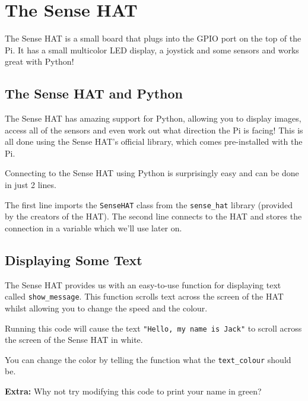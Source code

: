 \section{The Sense HAT}
	The Sense HAT is a small board that plugs into the GPIO port on the top of the Pi. It has a small multicolor LED display, a joystick and some sensors and works great with Python!

	\subsection{The Sense HAT and Python}

		The Sense HAT has amazing support for Python, allowing you to display images, access all of the sensors and even work out what direction the Pi is facing! This is all done using the Sense HAT's official library, which comes pre-installed with the Pi.

		Connecting to the Sense HAT using Python is surprisingly easy and can be done in just 2 lines.

		

		The first line imports the \texttt{SenseHAT} class from the \texttt{sense\_hat} library (provided by the creators of the HAT). The second line connects to the HAT and stores the connection in a variable which we'll use later on.

	\subsection{Displaying Some Text}

		The Sense HAT provides us with an easy-to-use function for displaying text called \texttt{show\_message}. This function scrolls text across the screen of the HAT whilst allowing you to change the speed and the colour.

		

		Running this code will cause the text \texttt{"Hello, my name is Jack"} to scroll across the screen of the Sense HAT in white.

		\webclearpage

		You can change the color by telling the function what the \texttt{text\_colour} should be.

		

		\textbf{Extra:} Why not try modifying this code to print your name in green?

